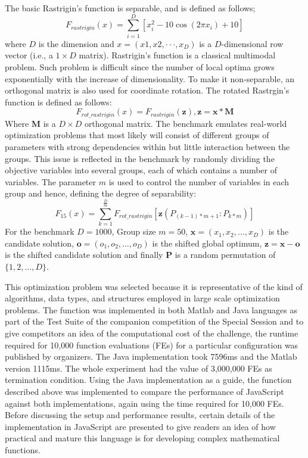 \documentclass[journal,onecolumn]{IEEEtran}
\begin{document}
The basic Rastrigin's function is separable, and is defined as follows;
\begin{equation}
F_{rastrigin}(x)=\sum\limits_{i=1}^D [ x_{i}^{2}-10\cos(2\pi x_i)+10  ] 
\end{equation}
where $D$ is the dimension and $x = (x1, x2, · · · , x_{D})$ is a
$D$-dimensional row vector (i.e., a $1 × D$ matrix). Rastrigin’s function 
is a classical multimodal problem. Such problem is difficult since the number of local
optima grows exponentially with the increase of dimensionality. To make it 
non-separable, an orthogonal matrix is also used for coordinate rotation.
The rotated Rastrgin’s function is defined as follows:
\begin{equation}
F_{rot\_rastrigin}(x)=F_{rastrigin}(\textbf{z}), \textbf{z}= \textbf{x} * \textbf{M}
\end{equation}
Where $\textbf{M}$ is  a $D \times{D}$ orthogonal matrix. The benchmark
emulates real-world optimization problems that most likely will consist 
of different groups of parameters with strong dependencies within
but little interaction between the groups. This issue is reflected in the benchmark 
by randomly dividing the objective variables
into several groups, each of which contains a number of variables. The parameter $m$ 
is used to control the number of variables in each group and hence, defining the degree
of separability:
\begin{equation}
F_{15}(x)=\sum\limits_{k=1}^\frac{D}{m}F_{rot\_rastrigin}[\textbf{z}(P_{(k-1)*m+1}:P_{k*m})] 
\end{equation}
For the benchmark $D = 1000$, Group size $m = 50$, $\textbf{x} = (x_1, x_2, \ldots , x_{D})$ is the
candidate solution, $\textbf{o} = (o_1, o_2, \ldots  , o_{D})$ is the shifted global optimum,
$\textbf{z} = \textbf{x} - \textbf{o}$ is the shifted candidate solution and
finally $\textbf{P}$ is a random permutation of $\lbrace1, 2, \ldots  ,D\rbrace$.

This optimization problem was selected because it is representative of the kind of
algorithms, data types, and structures employed in large scale optimization problems. 
The function was implemented in both Matlab and Java languages as part of the
Test Suite of the companion competition of the Special Session and to give competitors an idea of the
computational cost of the challenge, the runtime required for 10,000 function 
evaluations (FEs) for a particular configuration was published by organizers. The Java
implementation took 7596ms and the Matlab version 1115ms. The whole experiment had the value of
3,000,000 FEs as termination condition. Using the Java implementation as
a guide, the function described above was implemented to compare the performance of JavaScript against
both implementations, again using the time required for 10,000 FEs. 
Before discussing the setup and performance results, certain details of
the implementation in JavaScript are presented to give readers an idea of 
how practical and mature this language is for developing complex mathematical functions.
\end{document}
